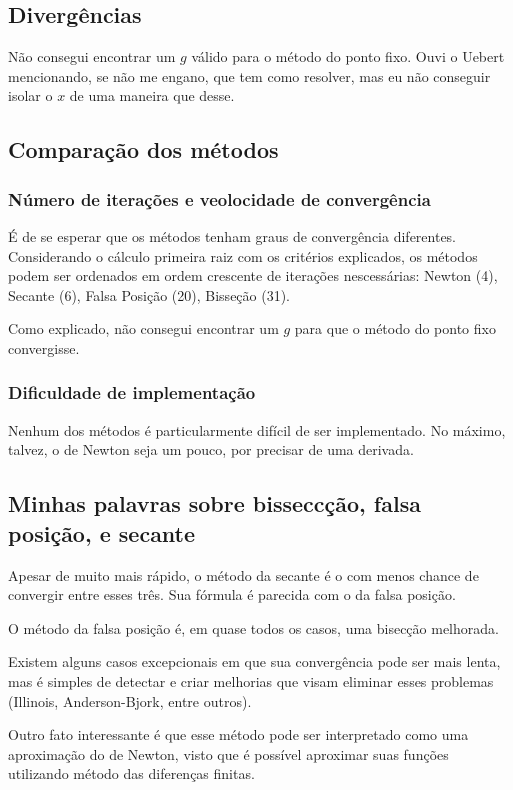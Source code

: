 \documentclass[12pt]{article}
\begin{document}
\subsection{Divergências}
Não consegui encontrar um \(g\) válido para o método do ponto fixo. Ouvi o Uebert mencionando, se não me engano, que tem como resolver, mas eu não conseguir isolar o \(x\) de uma maneira que desse.

\subsection{Comparação dos métodos}
\subsubsection{Número de iterações e veolocidade de convergência}
É de se esperar que os métodos tenham graus de convergência diferentes. Considerando o cálculo primeira raiz com os critérios explicados, os métodos podem ser ordenados em ordem crescente de iterações nescessárias: Newton (4), Secante (6), Falsa Posição (20), Bisseção (31).

Como explicado, não consegui encontrar um \(g\) para que o método do ponto fixo convergisse.

\subsubsection{Dificuldade de implementação}
Nenhum dos métodos é particularmente difícil de ser implementado. No máximo, talvez, o de Newton seja um pouco, por precisar de uma derivada.

\subsection{Minhas palavras sobre bisseccção, falsa posição, e secante}
Apesar de muito mais rápido, o método da secante é o com menos chance de convergir entre esses três. Sua fórmula é parecida com o da falsa posição.
\medskip

O método da falsa posição é, em quase todos os casos, uma bisecção melhorada. 

Existem alguns casos excepcionais em que sua convergência pode ser mais lenta, mas é simples de detectar e criar melhorias que visam eliminar esses problemas (Illinois, Anderson-Bjork, entre outros).

Outro fato interessante é que esse método pode ser interpretado como uma aproximação do de Newton, visto que é possível aproximar suas funções utilizando método das diferenças finitas.
\end{document}
